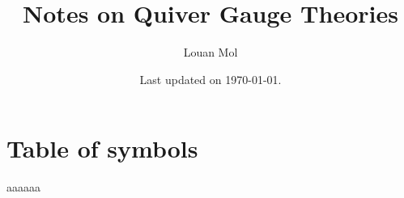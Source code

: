 \documentclass[a4paper,12pt]{article}
\title{Notes on Quiver Gauge Theories}
\author{Louan Mol}
\date{Last updated on \today.}
\begin{document}
\maketitle

\tableofcontents
  
\pagebreak


\section*{Table of symbols}

aaaaaa
\end{document}
